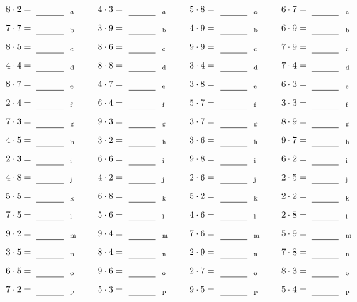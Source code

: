 \documentclass
[
  draft    = true,
  fontsize = 11pt,
  parskip  = half-
]
{scrartcl}
\begin{document}
\par\vfill\par
\begin{align*}
    \pline{8\cdot2}&=\rline{a}
  & \pline{4\cdot3}&=\rline{a}
  & \pline{5\cdot8}&=\rline{a}
  & \pline{6\cdot7}&=\rline{a} \\[1ex]
    \pline{7\cdot7}&=\rline{b}
  & \pline{3\cdot9}&=\rline{b}
  & \pline{4\cdot9}&=\rline{b}
  & \pline{6\cdot9}&=\rline{b} \\[1ex]
    \pline{8\cdot5}&=\rline{c}
  & \pline{8\cdot6}&=\rline{c}
  & \pline{9\cdot9}&=\rline{c}
  & \pline{7\cdot9}&=\rline{c} \\[1ex]
    \pline{4\cdot4}&=\rline{d}
  & \pline{8\cdot8}&=\rline{d}
  & \pline{3\cdot4}&=\rline{d}
  & \pline{7\cdot4}&=\rline{d} \\[1ex]
    \pline{8\cdot7}&=\rline{e}
  & \pline{4\cdot7}&=\rline{e}
  & \pline{3\cdot8}&=\rline{e}
  & \pline{6\cdot3}&=\rline{e} \\[1ex]
    \pline{2\cdot4}&=\rline{f}
  & \pline{6\cdot4}&=\rline{f}
  & \pline{5\cdot7}&=\rline{f}
  & \pline{3\cdot3}&=\rline{f} \\[1ex]
    \pline{7\cdot3}&=\rline{g}
  & \pline{9\cdot3}&=\rline{g}
  & \pline{3\cdot7}&=\rline{g}
  & \pline{8\cdot9}&=\rline{g} \\[1ex]
    \pline{4\cdot5}&=\rline{h}
  & \pline{3\cdot2}&=\rline{h}
  & \pline{3\cdot6}&=\rline{h}
  & \pline{9\cdot7}&=\rline{h} \\[1ex]
    \pline{2\cdot3}&=\rline{i}
  & \pline{6\cdot6}&=\rline{i}
  & \pline{9\cdot8}&=\rline{i}
  & \pline{6\cdot2}&=\rline{i} \\[1ex]
    \pline{4\cdot8}&=\rline{j}
  & \pline{4\cdot2}&=\rline{j}
  & \pline{2\cdot6}&=\rline{j}
  & \pline{2\cdot5}&=\rline{j} \\[1ex]
    \pline{5\cdot5}&=\rline{k}
  & \pline{6\cdot8}&=\rline{k}
  & \pline{5\cdot2}&=\rline{k}
  & \pline{2\cdot2}&=\rline{k} \\[1ex]
    \pline{7\cdot5}&=\rline{l}
  & \pline{5\cdot6}&=\rline{l}
  & \pline{4\cdot6}&=\rline{l}
  & \pline{2\cdot8}&=\rline{l} \\[1ex]
    \pline{9\cdot2}&=\rline{m}
  & \pline{9\cdot4}&=\rline{m}
  & \pline{7\cdot6}&=\rline{m}
  & \pline{5\cdot9}&=\rline{m} \\[1ex]
    \pline{3\cdot5}&=\rline{n}
  & \pline{8\cdot4}&=\rline{n}
  & \pline{2\cdot9}&=\rline{n}
  & \pline{7\cdot8}&=\rline{n} \\[1ex]
    \pline{6\cdot5}&=\rline{o}
  & \pline{9\cdot6}&=\rline{o}
  & \pline{2\cdot7}&=\rline{o}
  & \pline{8\cdot3}&=\rline{o} \\[1ex]
    \pline{7\cdot2}&=\rline{p}
  & \pline{5\cdot3}&=\rline{p}
  & \pline{9\cdot5}&=\rline{p}
  & \pline{5\cdot4}&=\rline{p}
\end{align*}
\end{document}
